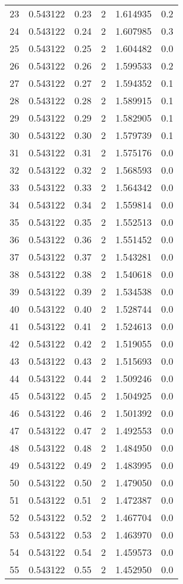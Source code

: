 \documentclass[11pt]{article}
\begin{document}
\begin{center}
\begin{tabular}{rrrrrr}
23 & 0.543122 & 0.23 & 2 & 1.614935 & 0.2\\
24 & 0.543122 & 0.24 & 2 & 1.607985 & 0.3\\
25 & 0.543122 & 0.25 & 2 & 1.604482 & 0.0\\
26 & 0.543122 & 0.26 & 2 & 1.599533 & 0.2\\
27 & 0.543122 & 0.27 & 2 & 1.594352 & 0.1\\
28 & 0.543122 & 0.28 & 2 & 1.589915 & 0.1\\
29 & 0.543122 & 0.29 & 2 & 1.582905 & 0.1\\
30 & 0.543122 & 0.30 & 2 & 1.579739 & 0.1\\
31 & 0.543122 & 0.31 & 2 & 1.575176 & 0.0\\
32 & 0.543122 & 0.32 & 2 & 1.568593 & 0.0\\
33 & 0.543122 & 0.33 & 2 & 1.564342 & 0.0\\
34 & 0.543122 & 0.34 & 2 & 1.559814 & 0.0\\
35 & 0.543122 & 0.35 & 2 & 1.552513 & 0.0\\
\hline
36 & 0.543122 & 0.36 & 2 & 1.551452 & 0.0\\
37 & 0.543122 & 0.37 & 2 & 1.543281 & 0.0\\
38 & 0.543122 & 0.38 & 2 & 1.540618 & 0.0\\
39 & 0.543122 & 0.39 & 2 & 1.534538 & 0.0\\
40 & 0.543122 & 0.40 & 2 & 1.528744 & 0.0\\
41 & 0.543122 & 0.41 & 2 & 1.524613 & 0.0\\
42 & 0.543122 & 0.42 & 2 & 1.519055 & 0.0\\
43 & 0.543122 & 0.43 & 2 & 1.515693 & 0.0\\
44 & 0.543122 & 0.44 & 2 & 1.509246 & 0.0\\
45 & 0.543122 & 0.45 & 2 & 1.504925 & 0.0\\
46 & 0.543122 & 0.46 & 2 & 1.501392 & 0.0\\
47 & 0.543122 & 0.47 & 2 & 1.492553 & 0.0\\
48 & 0.543122 & 0.48 & 2 & 1.484950 & 0.0\\
49 & 0.543122 & 0.49 & 2 & 1.483995 & 0.0\\
50 & 0.543122 & 0.50 & 2 & 1.479050 & 0.0\\
51 & 0.543122 & 0.51 & 2 & 1.472387 & 0.0\\
52 & 0.543122 & 0.52 & 2 & 1.467704 & 0.0\\
53 & 0.543122 & 0.53 & 2 & 1.463970 & 0.0\\
54 & 0.543122 & 0.54 & 2 & 1.459573 & 0.0\\
55 & 0.543122 & 0.55 & 2 & 1.452950 & 0.0\\
\hline
\end{tabular}
\end{center}
\end{document}
